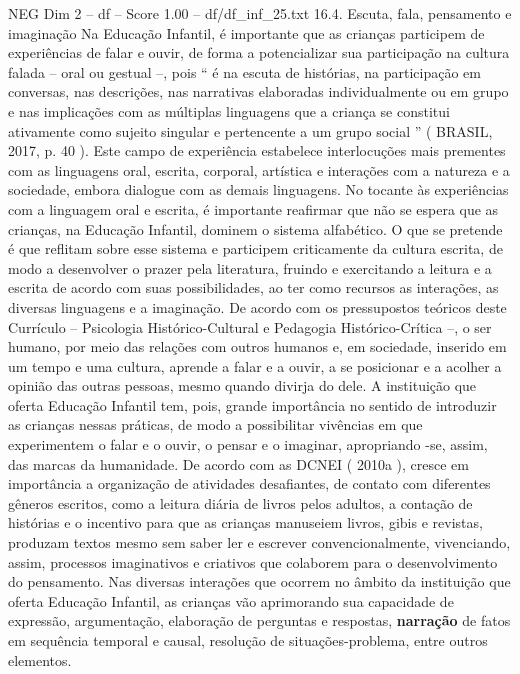 \begin{textsample}{NEG Dim 2 – df – Score 1.00 – df/df\_inf\_25.txt}  \label{ex:f2_neg_163}
16.4.
Escuta, fala, pensamento e imaginação Na Educação Infantil, é importante que as crianças participem de experiências de falar e ouvir, de forma a potencializar sua participação na cultura falada – oral ou gestual –, pois “ é na escuta de histórias, na participação em conversas, nas descrições, nas narrativas elaboradas individualmente ou em grupo e nas implicações com as múltiplas linguagens que a criança se constitui ativamente como sujeito singular e pertencente a um grupo social ” ( BRASIL, 2017, p. 40 ).
Este campo de experiência estabelece interlocuções mais prementes com as linguagens oral, escrita, corporal, artística e interações com a natureza e a sociedade, embora dialogue com as demais linguagens.
No tocante às experiências com a linguagem oral e escrita, é importante reafirmar que não se espera que as crianças, na Educação Infantil, dominem o sistema alfabético.
O que se pretende é que reflitam sobre esse sistema e participem criticamente da cultura escrita, de modo a desenvolver o prazer pela literatura, fruindo e exercitando a leitura e a escrita de acordo com suas possibilidades, ao ter como recursos as interações, as diversas linguagens e a imaginação.
De acordo com os pressupostos teóricos deste Currículo – Psicologia Histórico-Cultural e Pedagogia Histórico-Crítica –, o ser humano, por meio das relações com outros humanos e, em sociedade, inserido em um tempo e uma cultura, aprende a falar e a ouvir, a se posicionar e a acolher a opinião das outras pessoas, mesmo quando divirja do dele.
A instituição que oferta Educação Infantil tem, pois, grande importância no sentido de introduzir as crianças nessas práticas, de modo a possibilitar vivências em que experimentem o falar e o ouvir, o pensar e o imaginar, apropriando -se, assim, das marcas da humanidade.
De acordo com as DCNEI ( 2010a ), cresce em importância a organização de atividades desafiantes, de contato com diferentes gêneros escritos, como a leitura diária de livros pelos adultos, a contação de histórias e o incentivo para que as crianças manuseiem livros, gibis e revistas, produzam textos mesmo sem saber ler e escrever convencionalmente, vivenciando, assim, processos imaginativos e criativos que colaborem para o desenvolvimento do pensamento.
Nas diversas interações que ocorrem no âmbito da instituição que oferta Educação Infantil, as crianças vão aprimorando sua capacidade de expressão, argumentação, elaboração de perguntas e respostas, \textbf{narração} de fatos em sequência temporal e causal, resolução de situações-problema, entre outros elementos.

\end{textsample}
